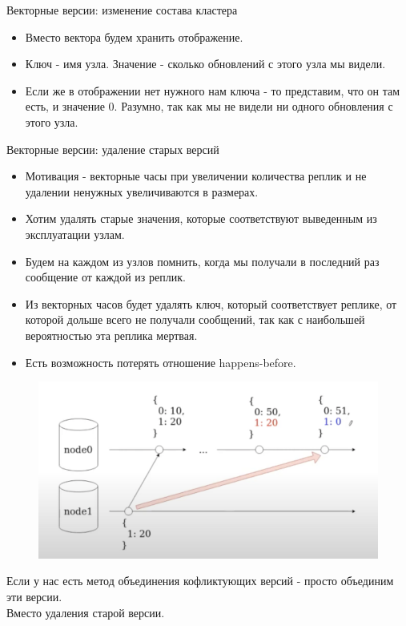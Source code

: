 \begin{definition}
  Векторные версии: изменение состава кластера
\end{definition}
\begin{itemize}
  \item Вместо вектора будем хранить отображение.
  \item Ключ - имя узла. Значение - сколько обновлений с этого узла мы видели.
  \item Если же в отображении нет нужного нам ключа - то представим, что он там есть, и значение $0$. Разумно, так как мы не видели ни одного обновления с этого узла.
\end{itemize}
\begin{definition}
  Векторные версии: удаление старых версий
\end{definition}
\begin{itemize}
  \item Мотивация - векторные часы при увеличении количества реплик и не удалении ненужных увеличиваются в размерах.
  \item Хотим удалять старые значения, которые соответствуют выведенным из эксплуатации узлам.
  \item Будем на каждом из узлов помнить, когда мы получали в последний раз сообщение от каждой из реплик.
  \item Из векторных часов будет удалять ключ, который соответствует реплике, от которой дольше всего не получали сообщений, так как с наибольшей вероятностью эта реплика мертвая.
  \item Есть возможность потерять отношение happens-before.
\end{itemize}
\begin{figure}[h]
    \centering
    \includegraphics[scale = 0.5]{../assets/9.png}
    \caption{}
\end{figure}
Если у нас есть метод объединения кофликтующих версий - просто объединим эти версии.\\
Вместо удаления старой версии.
